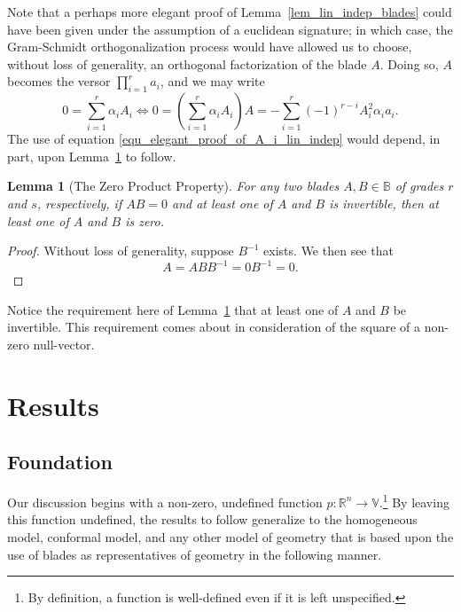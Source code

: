 \documentclass{birkjour}
\newtheorem{lem}[thm]{Lemma}
\theoremstyle{definition}
\theoremstyle{remark}
\numberwithin{equation}{section}
\newcommand{\R}{\mathbb{R}}
\newcommand{\B}{\mathbb{B}}
\newcommand{\V}{\mathbb{V}}
\begin{document}
Note that a perhaps more elegant proof of Lemma~\ref{lem_lin_indep_blades} could have been given
under the assumption
of a euclidean signature; in which case, the Gram-Schmidt orthogonalization process would have
allowed us to choose, without loss of generality, an orthogonal factorization of the blade $A$.
Doing so, $A$ becomes the versor $\prod_{i=1}^r a_i$, and we may write
\begin{equation}\label{equ_elegant_proof_of_A_i_lin_indep}
0 = \sum_{i=1}^r \alpha_iA_i \iff
0=\left(\sum_{i=1}^r\alpha_iA_i\right)A = -\sum_{i=1}^r(-1)^{r-i}A_i^2\alpha_ia_i.
\end{equation}
The use of equation \eqref{equ_elegant_proof_of_A_i_lin_indep} would depend, in part, upon Lemma~\ref{lem_zero_prod_property} to follow.

\begin{lem}[The Zero Product Property]\label{lem_zero_prod_property}
For any two blades $A,B\in\B$ of grades $r$ and $s$, respectively, if $AB=0$ and at least one of $A$ and $B$
is invertible, then at least one of $A$ and $B$ is zero.
\end{lem}
\begin{proof}
Without loss of generality, suppose $B^{-1}$ exists.  We then see that
\begin{equation}
A=ABB^{-1}=0B^{-1}=0.
\end{equation}
\end{proof}

Notice the requirement here of Lemma~\ref{lem_zero_prod_property} that at least one of $A$ and $B$ be invertible.
This requirement comes about in consideration of the square of a non-zero null-vector.

\section{Results}

\subsection{Foundation}

Our discussion begins with a non-zero, undefined function $p:\R^n\to\V$.\footnote{By definition, a function is well-defined even if it is left unspecified.}
By leaving this function undefined, the results to follow generalize to the homogeneous model, conformal model,
and any other model of geometry that is based upon the use of blades as representatives of geometry in the
following manner.
\end{document}
